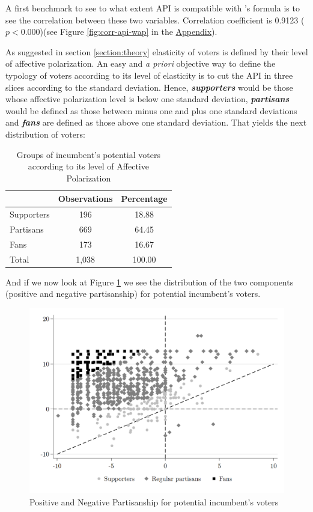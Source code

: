 \documentclass[a4paper, svgnames]{article}
\newcommand{\citeposs}[1]{\citeauthor{#1}'s \citeyearpar{#1}}
\begin{document}
A first benchmark to see to what extent API is compatible with \citeposs{Wagner2021} formula is to see the correlation between these two variables. Correlation coefficient is 0.9123 ($p<0.000$)(see Figure \ref{fig:corr-api-wap} in the \hyperref[appendix]{Appendix}).

As suggested in section \ref{section:theory} elasticity of voters is defined by their level of affective polarization. An easy and \textit{a priori} objective way to define the typology of voters according to its level of elasticity is to cut the API in three slices according to the standard deviation. Hence, \textit{\textbf{supporters}} would be those whose affective polarization level is below one standard deviation, \textit{\textbf{partisans}} would be defined as those between minus one and plus one standard deviations and \textit{\textbf{fans}} are defined as those above one standard deviation. That yields the next distribution of voters:

\begin{table}[H]
	\centering
	\caption{Groups of incumbent's potential voters according to its level of Affective Polarization}
	\label{tab:groups}
	\begin{tabular}{@{}lcc@{}}
		\toprule
		           & Observations & Percentage \\ \midrule
		Supporters & 196          & 18.88      \\
		Partisans  & 669          & 64.45      \\
		Fans       & 173          & 16.67      \\
		Total      & 1,038        & 100.00     \\ \bottomrule
	\end{tabular}
\end{table}

And if we now look at Figure \ref{fig:pos_neg_incumbent} we see the distribution of the two components (positive and negative partisanship) for potential incumbent's voters.

\begin{figure}[H]
	\centering
	\includegraphics[scale=0.3]{Figures/pos_neg_groups.png}
	\caption{Positive and Negative Partisanship for potential incumbent's voters}
	\label{fig:pos_neg_incumbent}
\end{figure}
\end{document}
